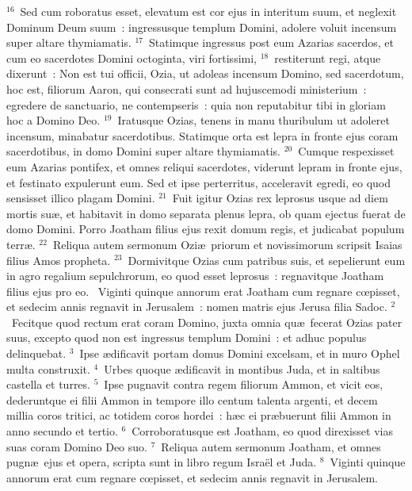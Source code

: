 ${}^{16}$~Sed cum roboratus esset, elevatum est cor ejus in interitum suum, et neglexit Dominum Deum suum~: ingressusque templum Domini, adolere voluit incensum super altare thymiamatis.
${}^{17}$~Statimque ingressus post eum Azarias sacerdos, et cum eo sacerdotes Domini octoginta, viri fortissimi,
${}^{18}$~restiterunt regi, atque dixerunt~: Non est tui officii, Ozia, ut adoleas incensum Domino, sed sacerdotum, hoc est, filiorum Aaron, qui consecrati sunt ad hujuscemodi ministerium~: egredere de sanctuario, ne contempseris~: quia non reputabitur tibi in gloriam hoc a Domino Deo.
${}^{19}$~Iratusque Ozias, tenens in manu thuribulum ut adoleret incensum, minabatur sacerdotibus. Statimque orta est lepra in fronte ejus coram sacerdotibus, in domo Domini super altare thymiamatis.
${}^{20}$~Cumque respexisset eum Azarias pontifex, et omnes reliqui sacerdotes, viderunt lepram in fronte ejus, et festinato expulerunt eum. Sed et ipse perterritus, acceleravit egredi, eo quod sensisset illico plagam Domini.
${}^{21}$~Fuit igitur Ozias rex leprosus usque ad diem mortis su\ae , et habitavit in domo separata plenus lepra, ob quam ejectus fuerat de domo Domini. Porro Joatham filius ejus rexit domum regis, et judicabat populum terr\ae .
${}^{22}$~Reliqua autem sermonum Ozi\ae\ priorum et novissimorum scripsit Isaias filius Amos propheta.
${}^{23}$~Dormivitque Ozias cum patribus suis, et sepelierunt eum in agro regalium sepulchrorum, eo quod esset leprosus~: regnavitque Joatham filius ejus pro eo.
~\lettrine[lines=10,image=true,loversize=0.05,lraise=-0.03]{V}{}iginti quinque annorum erat Joatham cum regnare cœpisset, et sedecim annis regnavit in Jerusalem~: nomen matris ejus Jerusa filia Sadoc.
${}^{2}$~Fecitque quod rectum erat coram Domino, juxta omnia qu\ae\ fecerat Ozias pater suus, excepto quod non est ingressus templum Domini~: et adhuc populus delinquebat.
${}^{3}$~Ipse \ae dificavit portam domus Domini excelsam, et in muro Ophel multa construxit.
${}^{4}$~Urbes quoque \ae dificavit in montibus Juda, et in saltibus castella et turres.
${}^{5}$~Ipse pugnavit contra regem filiorum Ammon, et vicit eos, dederuntque ei filii Ammon in tempore illo centum talenta argenti, et decem millia coros tritici, ac totidem coros hordei~: h\ae c ei pr\ae buerunt filii Ammon in anno secundo et tertio.
${}^{6}$~Corroboratusque est Joatham, eo quod direxisset vias suas coram Domino Deo suo.
${}^{7}$~Reliqua autem sermonum Joatham, et omnes pugn\ae\ ejus et opera, scripta sunt in libro regum Isra\"el et Juda.
${}^{8}$~Viginti quinque annorum erat cum regnare cœpisset, et sedecim annis regnavit in Jerusalem.
